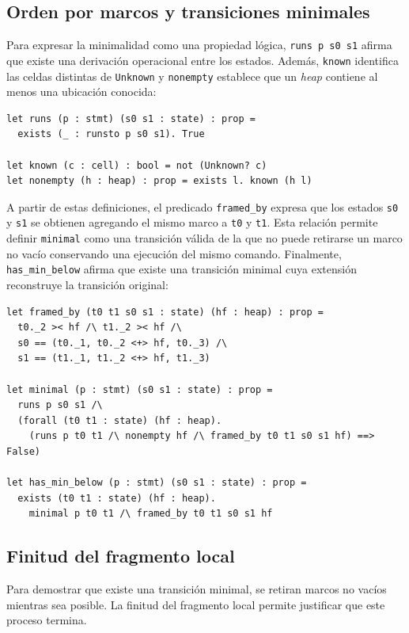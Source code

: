 \documentclass[a4paper,	11pt]{report}
\begin{document}
\subsection*{Orden por marcos y transiciones minimales}
Para expresar la minimalidad como una propiedad lógica,
\lstinline|runs p s0 s1| afirma que existe una derivación operacional entre los estados.
Además,
\lstinline|known| identifica las celdas distintas de \lstinline|Unknown|
y \lstinline|nonempty| establece que un \emph{heap} contiene al menos una ubicación conocida:

\begin{lstlisting}
let runs (p : stmt) (s0 s1 : state) : prop =
  exists (_ : runsto p s0 s1). True

let known (c : cell) : bool = not (Unknown? c)
let nonempty (h : heap) : prop = exists l. known (h l)
\end{lstlisting}

A partir de estas definiciones,
el predicado \lstinline|framed_by| expresa que los estados \lstinline|s0| y \lstinline|s1|
se obtienen agregando el mismo marco a \lstinline|t0| y \lstinline|t1|.
Esta relación permite definir \lstinline|minimal| como una transición válida de la que no puede retirarse un marco no vacío
conservando una ejecución del mismo comando.
Finalmente,
\lstinline|has_min_below| afirma que existe una transición minimal cuya extensión reconstruye la transición original:

\begin{lstlisting}
let framed_by (t0 t1 s0 s1 : state) (hf : heap) : prop =
  t0._2 >< hf /\ t1._2 >< hf /\
  s0 == (t0._1, t0._2 <+> hf, t0._3) /\
  s1 == (t1._1, t1._2 <+> hf, t1._3)

let minimal (p : stmt) (s0 s1 : state) : prop =
  runs p s0 s1 /\
  (forall (t0 t1 : state) (hf : heap).
    (runs p t0 t1 /\ nonempty hf /\ framed_by t0 t1 s0 s1 hf) ==> False)

let has_min_below (p : stmt) (s0 s1 : state) : prop =
  exists (t0 t1 : state) (hf : heap).
    minimal p t0 t1 /\ framed_by t0 t1 s0 s1 hf
\end{lstlisting}

\subsection*{Finitud del fragmento local}
Para demostrar que existe una transición minimal,
se retiran marcos no vacíos mientras sea posible.
La finitud del fragmento local permite justificar que este proceso termina.
\end{document}
